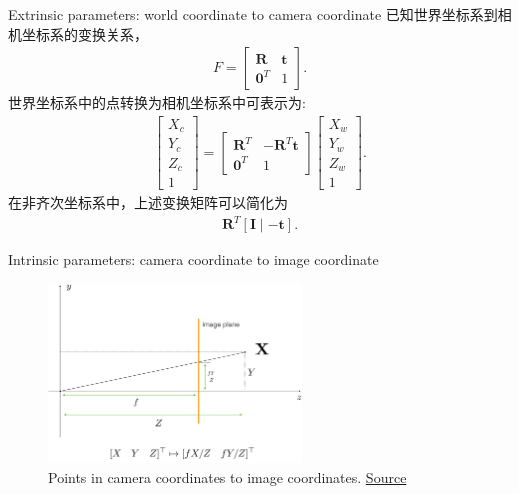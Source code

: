 \documentclass[10pt,xcolor={table,dvipsnames},t]{beamer}
\begin{document}
\begin{frame}{Extrinsic parameters: world coordinate to camera coordinate}
  已知世界坐标系到相机坐标系的变换关系，
  \begin{align*}
    F = \begin{bmatrix}
    \mathbf{R} & \mathbf{t} \\
    \mathbf{0}^T & 1
    \end{bmatrix}.
  \end{align*}
  世界坐标系中的点转换为相机坐标系中可表示为:
  \begin{align*}
    \begin{bmatrix} X_c \\ Y_c \\ Z_c \\ 1 \end{bmatrix}  = 
    \begin{bmatrix}
    \mathbf{R}^T & -\mathbf{R}^T\mathbf{t} \\
    \mathbf{0}^T & 1
    \end{bmatrix}
    \begin{bmatrix} X_w \\ Y_w \\ Z_w \\ 1 \end{bmatrix}.
  \end{align*}
  在非齐次坐标系中，上述变换矩阵可以简化为
  \begin{align*}
    \mathbf{R}^T [\mathbf{I} \mid -\mathbf{t}].
  \end{align*}
\end{frame}

\begin{frame}{Intrinsic parameters: camera coordinate to image coordinate}
  \begin{figure}
    \centering
    \includegraphics[width=0.6\textwidth]{figures/pinhole-similarity.png}
    \caption{Points in camera coordinates to image coordinates. \href{https://www.cs.cmu.edu/~16385/s17/Slides/11.1\_Camera\_matrix.pdf}{Source}}
  \end{figure}
\end{frame}
\end{document}
